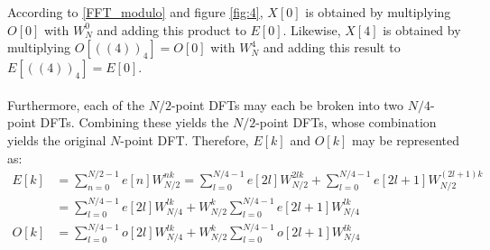 According to \eqref{FFT_modulo} and figure \ref{fig:4}, $X[0]$ is obtained by multiplying $O[0]$ with $W_N^0$ and adding this product to $E[0]$. Likewise, $X[4]$ is obtained by multiplying $O[((4))_4] = O[0]$ with $W_N^4$ and adding this result to $E[((4))_4] = E[0]$.
\\ \\
Furthermore, each of the $N/2$-point DFTs may each be broken into two $N/4$-point DFTs. Combining these yields the $N/2$-point DFTs, whose combination yields the original $N$-point DFT. Therefore, $E[k]$ and $O[k]$ may be represented as:
\begin{align*}
E[k] &= \sum_{n=0}^{N/2-1} e[n] W_{N/2}^{nk} = \sum_{l=0}^{N/4-1} e[2l] W_{N/2}^{2lk} + \sum_{l=0}^{N/4-1} e[2l+1] W_{N/2}^{(2l+1)k} \\
&= \sum_{l=0}^{N/4-1} e[2l] W_{N/4}^{lk} + W_{N/2}^k \sum_{l=0}^{N/4-1} e[2l+1] W_{N/4}^{lk} \\
O[k] &= \sum_{l=0}^{N/4-1} o[2l] W_{N/4}^{lk} + W_{N/2}^k \sum_{l=0}^{N/4-1} o[2l+1] W_{N/4}^{lk}
\end{align*}

